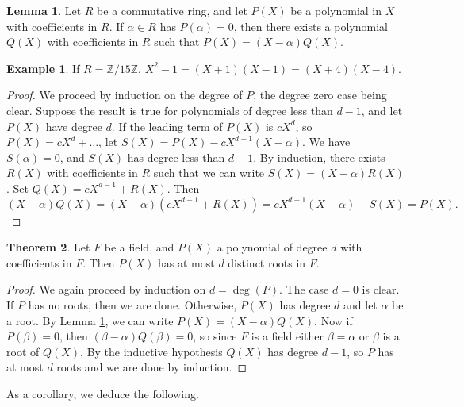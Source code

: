 \documentclass{article}
\newcommand{\Z}{\mathbb{Z}}
\newcommand{\rb}[1]{\left( #1 \right)}
\theoremstyle{definition}\newtheorem{definition}{Definition}
\theoremstyle{definition}\newtheorem{remark}[definition]{Remark}
\theoremstyle{definition}\newtheorem*{example}{Example}
\theoremstyle{definition}\newtheorem*{note}{Note}
\newtheorem{lemma}[definition]{Lemma}
\newtheorem{theorem}[definition]{Theorem}
\begin{document}
\begin{lemma}
\label{lem:21}
Let $ R $ be a commutative ring, and let $ P\rb{X} $ be a polynomial in $ X $ with coefficients in $ R $. If $ \alpha \in R $ has $ P\rb{\alpha} = 0 $, then there exists a polynomial $ Q\rb{X} $ with coefficients in $ R $ such that $ P\rb{X} = \rb{X - \alpha}Q\rb{X} $.
\end{lemma}

\begin{example}
If $ R = \Z / 15\Z $, $ X^2 - 1 = \rb{X + 1}\rb{X - 1} = \rb{X + 4}\rb{X - 4} $.
\end{example}

\begin{proof}
We proceed by induction on the degree of $ P $, the degree zero case being clear. Suppose the result is true for polynomials of degree less than $ d - 1 $, and let $ P\rb{X} $ have degree $ d $. If the leading term of $ P\rb{X} $ is $ cX^d $, so $ P\rb{X} = cX^d + \dots $, let $ S\rb{X} = P\rb{X} - cX^{d - 1}\rb{X - \alpha} $. We have $ S\rb{\alpha} = 0 $, and $ S\rb{X} $ has degree less than $ d - 1 $. By induction, there exists $ R\rb{X} $ with coefficients in $ R $ such that we can write $ S\rb{X} = \rb{X - \alpha}R\rb{X} $. Set $ Q\rb{X} = cX^{d - 1} + R\rb{X} $. Then
$$ \rb{X - \alpha}Q\rb{X} = \rb{X - \alpha}\rb{cX^{d - 1} + R\rb{X}} = cX^{d - 1}\rb{X - \alpha} + S\rb{X} = P\rb{X}. $$
\end{proof}

\begin{theorem}
\label{thm:22}
Let $ F $ be a field, and $ P\rb{X} $ a polynomial of degree $ d $ with coefficients in $ F $. Then $ P\rb{X} $ has at most $ d $ distinct roots in $ F $.
\end{theorem}

\begin{proof}
We again proceed by induction on $ d = \deg\rb{P} $. The case $ d = 0 $ is clear. If $ P $ has no roots, then we are done. Otherwise, $ P\rb{X} $ has degree $ d $ and let $ \alpha $ be a root. By Lemma \ref{lem:21}, we can write $ P\rb{X} = \rb{X - \alpha}Q\rb{X} $. Now if $ P\rb{\beta} = 0 $, then $ \rb{\beta - \alpha}Q\rb{\beta} = 0 $, so since $ F $ is a field either $ \beta = \alpha $ or $ \beta $ is a root of $ Q\rb{X} $. By the inductive hypothesis $ Q\rb{X} $ has degree $ d - 1 $, so $ P $ has at most $ d $ roots and we are done by induction.
\end{proof}

As a corollary, we deduce the following.
\end{document}
